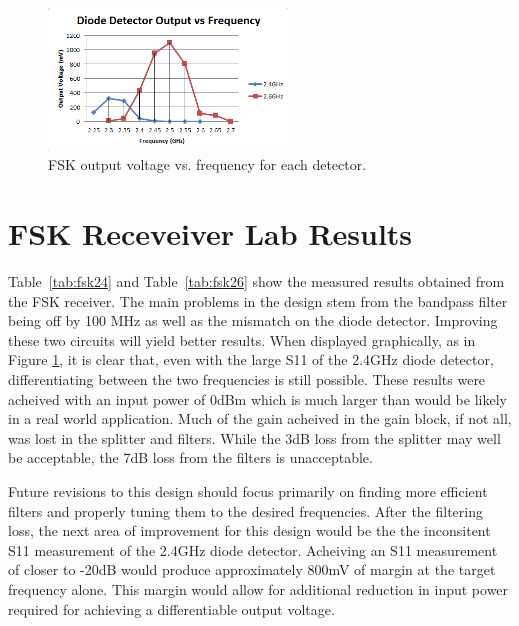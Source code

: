 \documentclass[conference]{IEEEtran}
\begin{document}
\begin{figure}[!htb]
\centering
\includegraphics[width=2.5in]{diode-pics/output_chart.PNG}
\caption{FSK output voltage vs. frequency for each detector.}
\label{fig:fsk_chart}
\end{figure}

\section{FSK Receveiver Lab Results}
Table~\ref{tab:fsk24} and Table~\ref{tab:fsk26} show the measured results obtained from the FSK receiver. The main problems in the design stem from the bandpass filter being off by 100 MHz as well as the mismatch on the diode detector. Improving these two circuits will yield better results. When displayed graphically, as in Figure \ref{fig:fsk_chart}, it is clear that, even with the large S11 of the 2.4GHz diode detector, differentiating between the two frequencies is still possible. These results were acheived with an input power of 0dBm which is much larger than would be likely in a real world application. Much of the gain acheived in the gain block, if not all, was lost in the splitter and filters. While the 3dB loss from the splitter may well be acceptable, the 7dB loss from the filters is unacceptable.

Future revisions to this design should focus primarily on finding more efficient filters and properly tuning them to the desired frequencies. After the filtering loss, the next area of improvement for this design would be the the inconsitent S11 measurement of the 2.4GHz diode detector. Acheiving an S11 measurement of closer to -20dB would produce approximately 800mV of margin at the target frequency alone. This margin would allow for additional reduction in input power required for achieving a differentiable output voltage.
\end{document}
